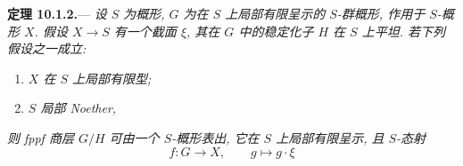 \medskip
{}\label{thm:sga3-V-10.1.2}%
\noindent\textbf{定理 10.1.2.}---%
\textit{设 \(S\) 为概形, \(G\) 为在 \(S\) 上局部有限呈示的
\(S\)-群概形, 作用于 \(S\)-概形
\(X\). 假设 \(X\to S\) 有一个截面 \(\xi\), 其在 \(G\) 中的稳定化子
\(H\) 在 \(S\) 上平坦. 若下列假设之一成立:}
\begin{enumerate}
\item[\textit{a)}]\label{thm:sga3-V-10.1.2-a}%
\textit{\(X\) 在 \(S\) 上局部有限型;}
\item[\textit{b)}]\label{thm:sga3-V-10.1.2-b}%
\textit{\(S\) 局部 Noether,}
\end{enumerate}
\textit{则 fppf 商层 \(G/H\) 可由一个
\(S\)-概形表出, 它在 \(S\) 上局部有限呈示, 且
\(S\)-态射}
\[
  f:G\longrightarrow X,\qquad g\longmapsto g\cdot\xi
\]


